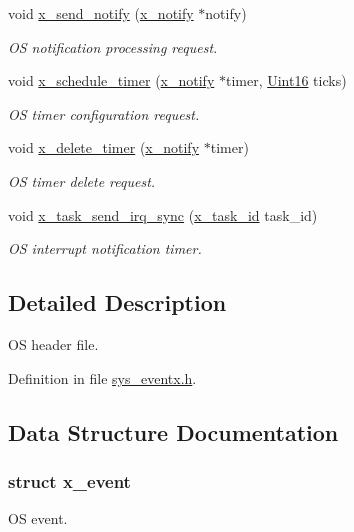 \begin{DoxyCompactItemize}
void \hyperlink{a00036_ae17b0bb16da3c471bb6074bb4c4d0fee}{x\+\_\+send\+\_\+notify} (\hyperlink{a00036_df/d4c/a00851}{x\+\_\+notify} $\ast$notify)
\begin{DoxyCompactList}\small\item\em O\+S notification processing request. \end{DoxyCompactList}\item 
void \hyperlink{a00036_a9e3befaa21e83f196f74201deed85346}{x\+\_\+schedule\+\_\+timer} (\hyperlink{a00036_df/d4c/a00851}{x\+\_\+notify} $\ast$timer, \hyperlink{a00072_a59a9f6be4562c327cbfb4f7e8e18f08b}{Uint16} ticks)
\begin{DoxyCompactList}\small\item\em O\+S timer configuration request. \end{DoxyCompactList}\item 
void \hyperlink{a00036_ab69e9af4cfa717e870d587906283635c}{x\+\_\+delete\+\_\+timer} (\hyperlink{a00036_df/d4c/a00851}{x\+\_\+notify} $\ast$timer)
\begin{DoxyCompactList}\small\item\em O\+S timer delete request. \end{DoxyCompactList}\item 
void \hyperlink{a00036_a9953756bc7c83e5f2c36830396136e75}{x\+\_\+task\+\_\+send\+\_\+irq\+\_\+sync} (\hyperlink{a00036_ad5c3c5fbfd3e4aadf22830395484a71d}{x\+\_\+task\+\_\+id} task\+\_\+id)
\begin{DoxyCompactList}\small\item\em O\+S interrupt notification timer. \end{DoxyCompactList}\end{DoxyCompactItemize}


\subsection{Detailed Description}
O\+S header file. 



Definition in file \hyperlink{a00036_source}{sys\+\_\+eventx.\+h}.



\subsection{Data Structure Documentation}
\label{de/d37/a00849}
\hypertarget{a00036_de/d37/a00849}{}
\subsubsection{struct x\+\_\+event}
O\+S event. 

